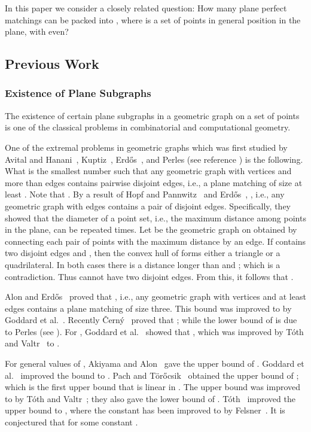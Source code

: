 \documentclass[11pt,a4paper]{article}
\begin{document}
In this paper we consider a closely related question: How many plane perfect matchings can be packed into , where  is a set of  points in general position in the plane, with  even? 
\subsection{Previous Work}
\label{previous-work-section}
\subsubsection{Existence of Plane Subgraphs}
The existence of certain plane subgraphs in a geometric graph on a set  of  points is one of the classical problems in combinatorial and computational geometry. 

One of the extremal problems in geometric graphs which was first studied by Avital and Hanani~\cite{Avital1966}, Kuptiz~\cite{Kupitz1979}, Erd\H{o}s~\cite{Erdos1946}, and Perles (see reference \cite{Toth1999}) is the following. What is the smallest number  such that any geometric graph with  vertices and more than  edges contains  pairwise disjoint edges, i.e., a plane matching of size at least . Note that . By a result of Hopf and Pannwitz~\cite{Hopf1934} and Erd\H{o}s~\cite{Erdos1946}, , i.e., any geometric graph with  edges contains a pair of disjoint edges. Specifically, they showed that the diameter of a point set, i.e., the maximum distance among  points in the plane, can be repeated  times. Let  be the geometric graph on  obtained by connecting each pair of points with the maximum distance by an edge. If  contains two disjoint edges  and , then the convex hull of  forms either a triangle or a quadrilateral. In both cases there is a distance longer than  and ; which is a contradiction. Thus  cannot have two disjoint edges. From this, it follows that .

Alon and Erd\H{o}s~\cite{Alon1989} proved that , i.e., any geometric graph with  vertices and at least  edges contains a plane matching of size three. This bound was improved to  by Goddard et al.~\cite{Goddard1996}. Recently {\v{C}}ern{\'{y}}~\cite{Cerny2005} proved that ; while the lower bound of  is due to Perles (see \cite{Cerny2005}). For , Goddard et al.~\cite{Goddard1996} showed that , which was improved by T{\'{o}}th and Valtr~\cite{Toth1999} to .

For general values of , Akiyama and Alon~\cite{Akiyama1989} gave the upper bound of . Goddard et al.~\cite{Goddard1996} improved the bound to . Pach and T{\"{o}}r{\H{o}}csik~\cite{Pach1994} obtained the upper bound of ; which is the first upper bound that is linear in . The upper bound was improved to  by T{\'{o}}th and Valtr~\cite{Toth1999}; they also gave the lower bound of . T{\'{o}}th~\cite{Toth2000} improved the upper bound to , where the constant has been improved to  by Felsner~\cite{Felsner2004}. It is conjectured that  for some constant .
\end{document}
